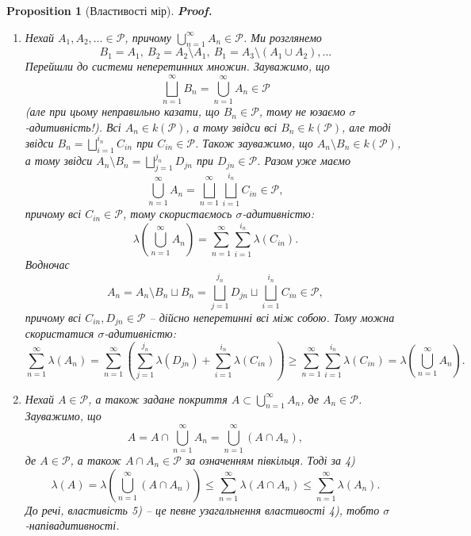 \documentclass[a4paper, 10pt]{article}
\makeatletter
\theoremstyle{theoremdd}
\newtheorem{proposition}[theorem]{Proposition}
\renewenvironment{proof}[1][Proof.\\]{\par
\pushQED{\hfill \qed}%
\normalfont \topsep6\p@\@plus6\p@\relax
\trivlist
\item\relax
{\bfseries
#1\@addpunct{.}}\hspace\labelsep\ignorespaces
}{%
\popQED\endtrivlist\@endpefalse
}
\makeatother
\begin{document}
\begin{proposition}[Властивості мір]
\begin{proof}
\begin{enumerate}[wide=0pt, label={\arabic*)}]
\item Нехай $A_1,A_2,\dots \in \mathcal{P}$, причому $\displaystyle\bigcup_{n=1}^\infty A_n \in \mathcal{P}$. Ми розглянемо 
\[
B_1 = A_1,\ B_2 = A_2 \setminus A_1,\ B_1 = A_3 \setminus (A_1 \cup A_2), \dots
\] Перейшли до системи неперетинних множин. Зауважимо, що 
\[
\displaystyle\bigsqcup_{n=1}^\infty B_n = \bigcup_{n=1}^\infty A_n \in \mathcal{P}
\] 
(але при цьому неправильно казати, що $B_n \in \mathcal{P}$, тому не юзаємо $\sigma$-адитивність!). Всі $A_n \in k(\mathcal{P})$, а тому звідси всі $B_n \in k(\mathcal{P})$, але тоді звідси $B_n = \displaystyle\bigsqcup_{i=1}^{i_n} C_{in}$ при $C_{in} \in \mathcal{P}$. Також зауважимо, що $A_n \setminus B_n \in k(\mathcal{P})$, а тому звідси $A_n \setminus B_n = \displaystyle\bigsqcup_{j=1}^{j_n} D_{jn}$ при $D_{jn} \in \mathcal{P}$. Разом уже маємо 
\[
\displaystyle\bigcup_{n=1}^\infty A_n = \bigsqcup_{n=1}^\infty \bigsqcup_{i=1}^{i_n} C_{in} \in \mathcal{P},
\]
причому всі $C_{in} \in \mathcal{P}$, тому скористаємось $\sigma$-адитивністю:
\[
\displaystyle\lambda\left( \bigcup_{n=1}^\infty A_n \right) = \sum_{n=1}^\infty \sum_{i=1}^{i_n} \lambda(C_{in}).
\]
Водночас 
\[
A_n = A_n \setminus B_n \sqcup B_n = \displaystyle\bigsqcup_{j=1}^{j_n} D_{jn} \sqcup \bigsqcup_{i=1}^{i_n} C_{in} \in \mathcal{P},
\]
причому всі $C_{in},D_{jn} \in \mathcal{P}$ -- дійсно неперетинні всі між собою. Тому можна скористатися $\sigma$-адитивністю:
\[
\displaystyle\sum_{n=1}^\infty \lambda(A_n) = \sum_{n=1}^\infty \left( \sum_{j=1}^{j_n} \lambda(D_{jn}) + \sum_{i=1}^{i_n} \lambda(C_{in}) \right) \geq \sum_{n=1}^\infty \sum_{i=1}^{i_n} \lambda(C_{in}) = \lambda\left( \bigcup_{n=1}^\infty A_n \right).
\]

\item Нехай $A \in \mathcal{P}$, а також задане покриття $A \subset \displaystyle\bigcup_{n=1}^\infty A_n$, де $A_n \in \mathcal{P}$. Зауважимо, що 
\[
A = A \cap \displaystyle\bigcup_{n=1}^\infty A_n = \bigcup_{n=1}^\infty (A \cap A_n),
\]
де $A \in \mathcal{P}$, а також $A \cap A_n \in \mathcal{P}$ за означенням півкільця. Тоді за 4)
\[
\displaystyle\lambda(A) = \lambda\left( \bigcup_{n=1}^\infty (A \cap A_n) \right) \leq \sum_{n=1}^\infty \lambda(A \cap A_n) \leq \sum_{n=1}^\infty \lambda(A_n).
\]
\textit{До речі, властивість 5) -- це певне узагальнення властивості 4), тобто $\sigma$-напівадитивності.} \qedhere
\end{enumerate} 
\end{proof}
\end{proposition}
\end{document}
